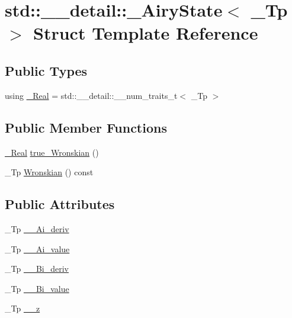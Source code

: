 \hypertarget{structstd_1_1____detail_1_1__AiryState}{}\section{std\+:\+:\+\_\+\+\_\+detail\+:\+:\+\_\+\+Airy\+State$<$ \+\_\+\+Tp $>$ Struct Template Reference}
\label{structstd_1_1____detail_1_1__AiryState}
\subsection*{Public Types}
\begin{DoxyCompactItemize}
\item 
using \hyperlink{structstd_1_1____detail_1_1__AiryState_a8fc5c7c19e6dd8f25f1e4103f74c0a3b}{\+\_\+\+Real} = std\+::\+\_\+\+\_\+detail\+::\+\_\+\+\_\+num\+\_\+traits\+\_\+t$<$ \+\_\+\+Tp $>$
\end{DoxyCompactItemize}
\subsection*{Public Member Functions}
\begin{DoxyCompactItemize}
\item 
\hyperlink{structstd_1_1____detail_1_1__AiryState_a8fc5c7c19e6dd8f25f1e4103f74c0a3b}{\+\_\+\+Real} \hyperlink{structstd_1_1____detail_1_1__AiryState_a6c519145b38f24b2dab705fbc23f49d6}{true\+\_\+\+Wronskian} ()
\item 
\+\_\+\+Tp \hyperlink{structstd_1_1____detail_1_1__AiryState_a565f891531681d918aa85320ad776428}{Wronskian} () const
\end{DoxyCompactItemize}
\subsection*{Public Attributes}
\begin{DoxyCompactItemize}
\item 
\+\_\+\+Tp \hyperlink{structstd_1_1____detail_1_1__AiryState_a3d918b7b8cb09fd4bb57c10a5853c36f}{\+\_\+\+\_\+\+Ai\+\_\+deriv}
\item 
\+\_\+\+Tp \hyperlink{structstd_1_1____detail_1_1__AiryState_ad4a37f92020588e84a18fc1e93b02af6}{\+\_\+\+\_\+\+Ai\+\_\+value}
\item 
\+\_\+\+Tp \hyperlink{structstd_1_1____detail_1_1__AiryState_a0f80df510bae0d9a812fae2a20ac3c20}{\+\_\+\+\_\+\+Bi\+\_\+deriv}
\item 
\+\_\+\+Tp \hyperlink{structstd_1_1____detail_1_1__AiryState_a10ef7705b2b52a40502d75e62add672f}{\+\_\+\+\_\+\+Bi\+\_\+value}
\item 
\+\_\+\+Tp \hyperlink{structstd_1_1____detail_1_1__AiryState_a7606b501eba3f9b55aafa1706d7c9cc1}{\+\_\+\+\_\+z}
\end{DoxyCompactItemize}


